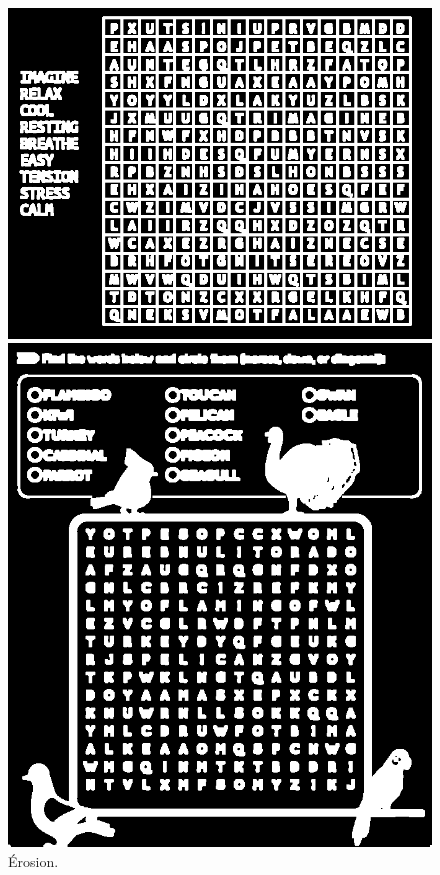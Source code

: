 \documentclass{article}
\begin{document}
\begin{figure}[H]
  \centering
      \includegraphics[width=\linewidth]{ressources/1level_1_image_1_09_eroded.png}
      \caption{}
    \endminipage\quad\quad\quad\quad
    \includegraphics[width=\linewidth]{ressources/3level_3_image_2_09_eroded.png}
    \caption{}
  \endminipage
  \caption{Érosion.}
\end{figure}
\end{document}
